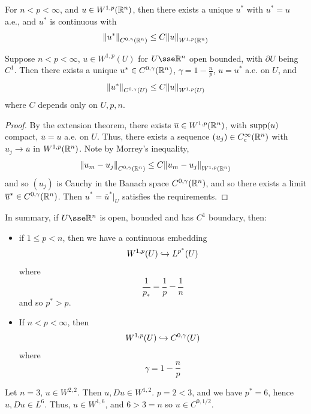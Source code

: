 \documentclass{article}
\begin{document}
\lec

\begin{corollary}
    For \(n < p < \infty\), and \(u \in W^{1, p}(\mathbb{R}^n)\), then there exists a unique \(u^*\) with \(u^* = u\) a.e., and \(u^*\) is continuous with
    \[\norm{u^*}_{C^{0, \gamma}(\mathbb{R}^n)} \le C\norm{u}_{W^{1, p}(\mathbb{R}^n)}\]
\end{corollary}

\begin{corollary}
    Suppose \(n < p < \infty\), \(u \in W^{1, p}(U)\) for \(U \sse \R^n\) open bounded, with \(\partial U\) being \(C^1\). Then there exists a unique \(u^* \in C^{0, \gamma}(\mathbb{R}^n)\), \(\gamma = 1 - \frac{n}{p}\), \(u = u^*\) a.e. on \(U\), and
    \[\norm{u^*}_{C^{0, \gamma}(U)} \le C\norm{u}_{W^{1, p}(U)}\]
    where \(C\) depends only on \(U, p, n\).
\end{corollary}

\begin{proof}
    By the extension theorem, there exists \(\overline u \in W^{1, p}(\mathbb{R}^n)\), with \(\operatorname{supp}(u)\) compact, \(\overline{u} = u\) a.e. on \(U\). Thus, there exists a sequence \((u_j) \in C_c^\infty(\mathbb{R}^n)\) with \(u_j \to \overline u\) in \(W^{1,p}(\mathbb{R}^n)\). Note by Morrey's inequality,
    \[\norm{u_m - u_j}_{C^{0, \gamma}(\mathbb{R}^n)} \le C\norm{u_m - u_j}_{W^{1, p}(\mathbb{R}^n)}\]
    and so \((u_j)\) is Cauchy in the Banach space \(C^{0, \gamma}(\mathbb{R}^n)\), and so there exists a limit \(\overline u^* \in C^{0, \gamma}(\mathbb{R}^n)\). Then \(u^* = \overline u^*\vert_U\) satisfies the requirements.
\end{proof}

In summary, if \(U \sse \R^n\) is open, bounded and has \(C^1\) boundary, then:

\begin{itemize}
    \item if \(1 \le p < n\), then we have a continuous embedding
    \[W^{1, p}(U) \hookrightarrow L^{p^*}(U)\]
    where
    \[\frac{1}{p_*} = \frac{1}{p} - \frac{1}{n}\]
    and so \(p^* > p\).
    \item If \(n < p < \infty\), then
    \[W^{1, p}(U) \hookrightarrow C^{0, \gamma}(U)\]
    where
    \[\gamma = 1 - \frac{n}{p}\]
\end{itemize}

\begin{example}
    Let \(n = 3\), \(u \in W^{2, 2}\). Then \(u, Du \in W^{1,2}\). \(p = 2 < 3\), and we have \(p^* = 6\), hence \(u, Du \in L^6\). Thus, \(u \in W^{1, 6}\), and \(6 > 3 = n\) so \(u \in C^{0, 1/2}\).
\end{example}
\end{document}
